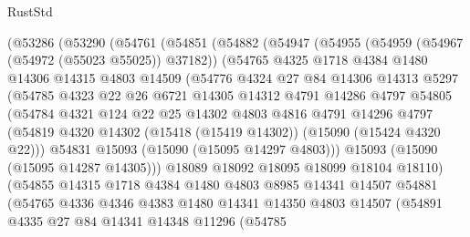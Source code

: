\begin{lexlean}{RustStd}
\begin{coremodule}
    (@53286
      (@53290
        (@54761
          (@54851
            (@54882
              (@54947
                (@54955
                  (@54959 (@54967 (@54972 (@55023 @55025)) @37182))
                  (@54765
                    @4325
                    @1718
                    @4384
                    @1480
                    @14306
                    @14315
                    @4803
                    @14509
                    (@54776
                      @4324
                      @27
                      @84
                      @14306
                      @14313
                      @5297
                      (@54785
                        @4323
                        @22
                        @26
                        @6721
                        @14305
                        @14312
                        @4791
                        @14286
                        @4797
                        @54805
                        (@54784
                          @4321
                          @124
                          @22
                          @25
                          @14302
                          @4803
                          @4816
                          @4791
                          @14296
                          @4797
                          (@54819 @4320 @14302 (@15418 (@15419 @14302)) (@15090 (@15424 @4320 @22)))
                          @54831
                          @15093
                          (@15090 (@15095 @14297 @4803)))
                        @15093
                        (@15090 (@15095 @14287 @14305)))
                      @18089
                      @18092
                      @18095
                      @18099
                      @18104
                      @18110)
                    (@54855
                      @14315
                      @1718
                      @4384
                      @1480
                      @4803
                      @8985
                      @14341
                      @14507
                      @54881
                      (@54765
                        @4336
                        @4346
                        @4383
                        @1480
                        @14341
                        @14350
                        @4803
                        @14507
                        (@54891
                          @4335
                          @27
                          @84
                          @14341
                          @14348
                          @11296
                          (@54785

\end{coremodule}
\end{lexlean}
